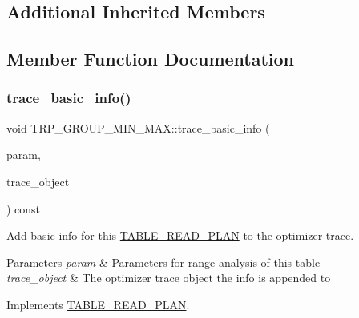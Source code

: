 \subsection*{Additional Inherited Members}


\subsection{Member Function Documentation}
\mbox{\label{classTRP__GROUP__MIN__MAX_aeff4d1a82cdb7f15f61d34191971967f}} 
\subsubsection{\texorpdfstring{trace\+\_\+basic\+\_\+info()}{trace\_basic\_info()}}
{\footnotesize\ttfamily void T\+R\+P\+\_\+\+G\+R\+O\+U\+P\+\_\+\+M\+I\+N\+\_\+\+M\+A\+X\+::trace\+\_\+basic\+\_\+info (\begin{DoxyParamCaption}\item[{const \mbox{\hyperlink{classPARAM}{P\+A\+R\+AM}} $\ast$}]{param,  }\item[{\mbox{\hyperlink{classOpt__trace__object}{Opt\+\_\+trace\+\_\+object}} $\ast$}]{trace\+\_\+object }\end{DoxyParamCaption}) const\hspace{0.3cm}{\ttfamily [virtual]}}

Add basic info for this \mbox{\hyperlink{classTABLE__READ__PLAN}{T\+A\+B\+L\+E\+\_\+\+R\+E\+A\+D\+\_\+\+P\+L\+AN}} to the optimizer trace.


\begin{DoxyParams}{Parameters}
{\em param} & Parameters for range analysis of this table \\
\hline
{\em trace\+\_\+object} & The optimizer trace object the info is appended to \\
\hline
\end{DoxyParams}


Implements \mbox{\hyperlink{classTABLE__READ__PLAN_a35e1758c9edce0c8bea19a602409f861}{T\+A\+B\+L\+E\+\_\+\+R\+E\+A\+D\+\_\+\+P\+L\+AN}}.



